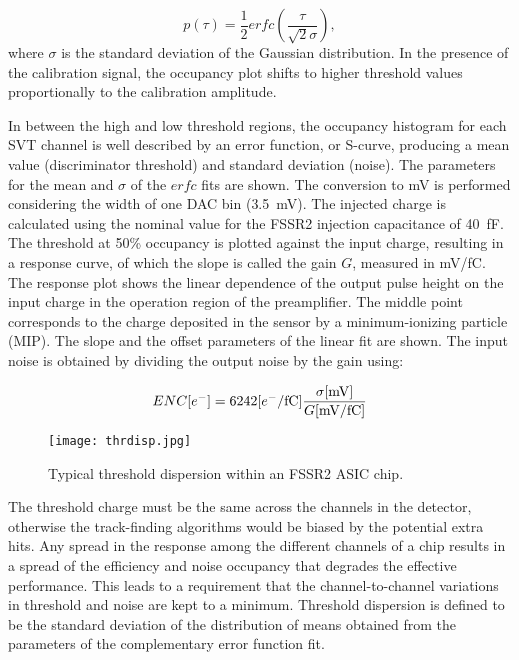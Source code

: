 \begin{equation}
  p(\tau)=\frac{1}{2} erfc \left( \frac{\tau}{\sqrt{2}\sigma} \right)
  \label{eq:erfc},
\end{equation}
where $\sigma$ is the standard deviation of the Gaussian distribution. In the presence of the calibration signal,
the occupancy plot shifts to higher threshold values proportionally to the calibration amplitude.

In between the high and low threshold regions, the occupancy histogram for each SVT channel is well described by
an error function, or S-curve, producing a mean value (discriminator threshold) and standard deviation (noise). The
parameters for the mean and $\sigma$ of the $erfc$ fits are shown. The conversion to mV is performed considering
the width of one DAC bin (3.5~mV). The injected charge is calculated using the nominal value for the FSSR2 injection
capacitance of 40~fF. The threshold at 50\% occupancy is plotted against the input charge, resulting in a response
curve, of which the slope is called the gain $G$, measured in mV/fC. The response plot shows the linear dependence
of the output pulse height on the input charge in the operation region of the preamplifier. The middle point
corresponds to the charge deposited in the sensor by a minimum-ionizing particle (MIP). The slope and the offset
parameters of the linear fit are shown. The input noise is obtained by dividing the output noise by the gain using:

\begin{equation}
  ENC[e^{-}]=6242[e^{-}/{\rm fC}]\frac{\sigma[{\rm mV}]}{G[{\rm mV/fC}]}
  \label{eq:enc}
\end{equation}

\begin{figure}[hbt] 
	\centering 
	\texttt{[image: thrdisp.jpg]}
	\caption{Typical threshold dispersion within an FSSR2 ASIC chip.}
	\label{fig:thrdisp}
\end{figure}

The threshold charge must be the same across the channels in the detector, otherwise the track-finding algorithms
\cite{recon-nim} would be biased by the potential extra hits. Any spread in the response among the different
channels of a chip results in a spread of the efficiency and noise occupancy that degrades the effective performance.
This leads to a requirement that the channel-to-channel variations in threshold and noise are kept to a minimum.
Threshold dispersion is defined to be the standard deviation of the distribution of means obtained from the
parameters of the complementary error function fit.

